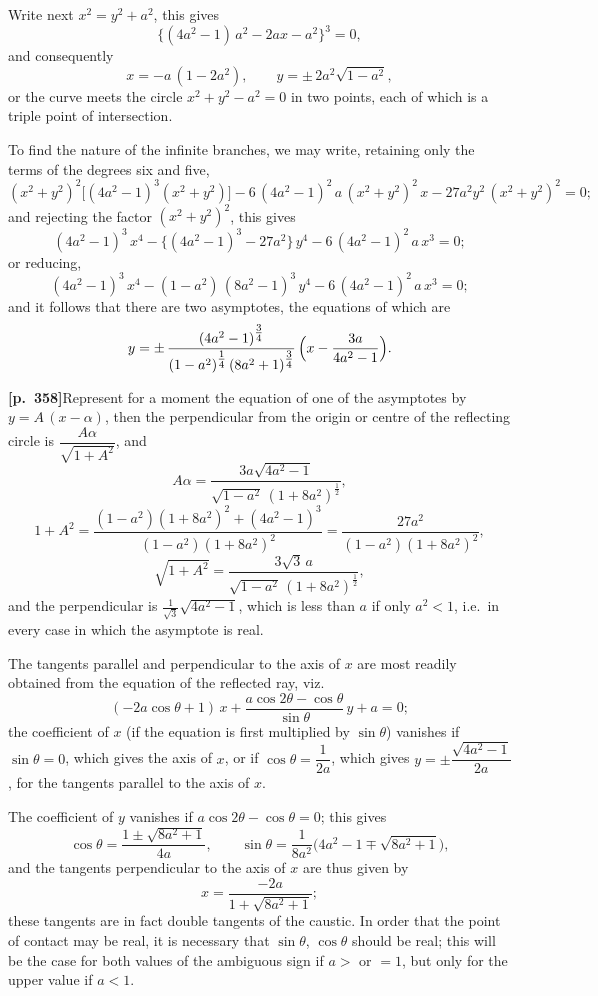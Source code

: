 \documentclass[11pt]{article}
\begin{document}
Write next $x^{2} = y^{2} + a^{2}$, this gives
\[
\bigl\{(4a^{2}-1)\,a^{2} - 2ax - a^{2}\bigr\}^{3} = 0,
\]
and consequently
\[
x = -a\,(1 - 2a^{2}),\qquad y = \pm\,2a^{2}\sqrt{1 - a^{2}},
\]
or the curve meets the circle $x^{2} + y^{2} - a^{2} = 0$ in two points, each of which is a triple point of intersection.

To find the nature of the infinite branches, we may write, retaining only the terms of the degrees six and five,
\[
(x^{2}+y^{2})^{2}\bigl[(4a^{2}-1)^{3}(x^{2}+y^{2})\bigr] - 6\,(4a^{2}-1)^{2}\,a\,(x^{2}+y^{2})^{2}\,x - 27a^{2}y^{2}\,(x^{2}+y^{2})^{2} = 0;
\]
and rejecting the factor $(x^{2}+y^{2})^{2}$, this gives
\[
(4a^{2}-1)^{3}\,x^{4} - \bigl\{(4a^{2}-1)^{3} - 27a^{2}\bigr\}\,y^{4} - 6\,(4a^{2}-1)^{2}\,a\,x^{3} = 0;
\]
or reducing,
\[
(4a^{2}-1)^{3}\,x^{4} - (1 - a^{2})\,(8a^{2}-1)^{3}\,y^{4} - 6\,(4a^{2}-1)^{2}\,a\,x^{3} = 0;
\]
and it follows that there are two asymptotes, the equations of which are
\[
y = \pm\,\frac{(4a^{2}-1)^{\tfrac{3}{4}}}{(1 - a^{2})^{\tfrac{1}{4}}\,(8a^{2}+1)^{\tfrac{3}{4}}}\,\Bigl(x - \frac{3a}{4a^{2}-1}\Bigr).
\]

\noindent\textbf{[p.~358]}\quad Represent for a moment the equation of one of the asymptotes by $y = A\,(x - \alpha)$, then the perpendicular from the origin or centre of the reflecting circle is $\dfrac{A\alpha}{\sqrt{1 + A^{2}}}$, and
\[
A\alpha = \frac{3a\sqrt{4a^{2}-1}}{\sqrt{1 - a^{2}}\,(1 + 8a^{2})^{\tfrac{1}{2}}},
\]
\[
1 + A^{2} = \frac{(1 - a^{2})(1 + 8a^{2})^{2} + (4a^{2}-1)^{3}}{(1 - a^{2})(1 + 8a^{2})^{2}} = \frac{27a^{2}}{(1 - a^{2})(1 + 8a^{2})^{2}},
\]
\[
\sqrt{1 + A^{2}} = \frac{3\sqrt{3}\,a}{\sqrt{1 - a^{2}}\,(1 + 8a^{2})^{\tfrac{1}{2}}},
\]
and the perpendicular is $\tfrac{1}{\sqrt{3}}\sqrt{4a^{2}-1}$, which is less than $a$ if only $a^{2} < 1$, i.e.\ in every case in which the asymptote is real.

The tangents parallel and perpendicular to the axis of $x$ are most readily obtained from the equation of the reflected ray, viz.
\[
(-2a\cos\theta + 1)\,x + \frac{a\cos 2\theta - \cos\theta}{\sin\theta}\,y + a = 0;
\]
the coefficient of $x$ (if the equation is first multiplied by $\sin\theta$) vanishes if $\sin\theta = 0$, which gives the axis of $x$, or if $\cos\theta = \dfrac{1}{2a}$, which gives $y = \pm\dfrac{\sqrt{4a^{2}-1}}{2a}$, for the tangents parallel to the axis of $x$.

The coefficient of $y$ vanishes if $a\cos 2\theta - \cos\theta = 0$; this gives
\[
\cos\theta = \frac{1 \pm \sqrt{8a^{2}+1}}{4a},\qquad \sin\theta = \frac{1}{8a^{2}}\bigl(4a^{2} - 1 \mp \sqrt{8a^{2}+1}\bigr),
\]
and the tangents perpendicular to the axis of $x$ are thus given by
\[
x = \frac{-2a}{1 + \sqrt{8a^{2}+1}};
\]
these tangents are in fact double tangents of the caustic. In order that the point of contact may be real, it is necessary that $\sin\theta$, $\cos\theta$ should be real; this will be the case for both values of the ambiguous sign if $a >$ or $= 1$, but only for the upper value if $a < 1$.
\end{document}
